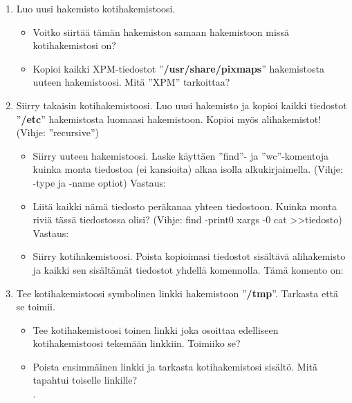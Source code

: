 \documentclass[12pt,portrait,a4]{article}
\begin{document}
\begin{enumerate}
\item Luo uusi hakemisto kotihakemistoosi.
	\begin{itemize}
	\item Voitko siirtää tämän hakemiston samaan hakemistoon missä kotihakemistosi on?
\hrulefill
	\item Kopioi kaikki XPM-tiedostot ''\textbf{/usr/share/pixmaps}'' hakemistosta uuteen
hakemistoosi.  Mitä ''XPM'' tarkoittaa? \hrulefill

	\end{itemize}

\item Siirry takaisin kotihakemistoosi.  Luo uusi hakemisto ja kopioi kaikki
	tiedostot ''\textbf{/etc}'' hakemistosta luomaasi hakemistoon.  Kopioi myös
	alihakemistot!  (Vihje: ''recursive'')
	        \begin{itemize}
			\item Siirry uuteen hakemistoosi.  Laske käyttäen ''find''- ja ''wc''-komentoja kuinka monta tiedostoa (ei kansioita) alkaa isolla alkukirjaimella. (Vihje: -type ja -name optiot)  Vastaus: \hrulefill
		        \item Liitä kaikki nämä tiedosto peräkanaa yhteen tiedostoon. Kuinka monta riviä tässä tiedostossa olisi?  (Vihje: find -print0 \textbar xargs -0 cat \textgreater\textgreater tiedosto)  Vastaus: \hrulefill
		        \item Siirry kotihakemistoosi.  Poista kopioimasi tiedostot sisältävä alihakemisto ja kaikki sen sisältämät tiedostot yhdellä komennolla.  Tämä komento on: \hrulefill
	        \end{itemize}

\item Tee kotihakemistoosi symbolinen linkki hakemistoon ''\textbf{/tmp}''.  Tarkasta
että se toimii.
	\begin{itemize}
	\item Tee kotihakemistoosi toinen linkki joka osoittaa edelliseen kotihakemistoosi
tekemään linkkiin.  Toimiiko se? \hrulefill
	\item Poista ensimmäinen linkki ja tarkasta kotihakemistosi sisältö.
Mitä tapahtui toiselle linkille? \\ . \hrulefill
	\end{itemize}
\end{enumerate}
\end{document}
